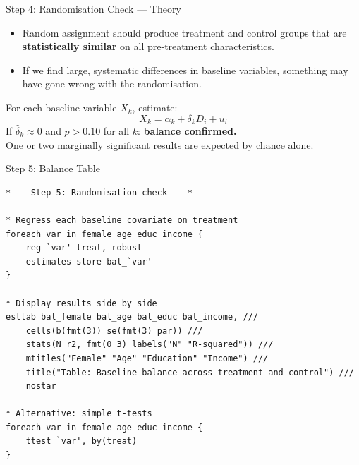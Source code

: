 \documentclass[aspectratio=169, 11pt]{beamer}
\begin{document}

\begin{frame}[t]{Step 4: Randomisation Check --- Theory}
\begin{itemize}
  \setlength\itemsep{0.5em}
  \item Random assignment should produce treatment and control groups that are \textbf{statistically similar} on all pre-treatment characteristics.
  \item If we find large, systematic differences in baseline variables, something may have gone wrong with the randomisation.
\end{itemize}
\vspace{0.4em}
\begin{keybox}
For each baseline variable $X_k$, estimate:
\[
  X_k = \alpha_k + \delta_k D_i + u_i
\]
If $\hat\delta_k \approx 0$ and $p > 0.10$ for all $k$: \textbf{balance confirmed.}\\[0.2em]
One or two marginally significant results are expected by chance alone.
\end{keybox}
\vspace{0.3em}
\end{frame}


\begin{frame}[fragile, t]{Step 5: Balance Table}
\begin{footnotesize}
\begin{verbatim}
*--- Step 5: Randomisation check ---*

* Regress each baseline covariate on treatment
foreach var in female age educ income {
    reg `var' treat, robust
    estimates store bal_`var'
}

* Display results side by side
esttab bal_female bal_age bal_educ bal_income, ///
    cells(b(fmt(3)) se(fmt(3) par)) ///
    stats(N r2, fmt(0 3) labels("N" "R-squared")) ///
    mtitles("Female" "Age" "Education" "Income") ///
    title("Table: Baseline balance across treatment and control") ///
    nostar

* Alternative: simple t-tests
foreach var in female age educ income {
    ttest `var', by(treat)
}
\end{verbatim}
\end{footnotesize}
\vspace{0.2em}
\end{frame}
\end{document}
